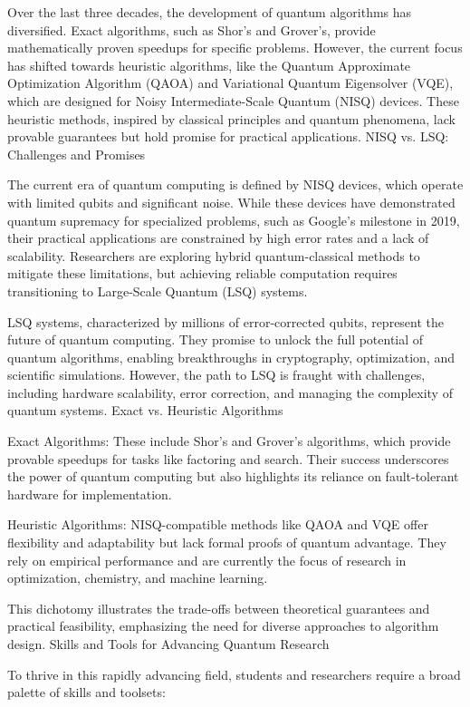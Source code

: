 Over the last three decades, the development of quantum algorithms has diversified. Exact algorithms, such as Shor’s and Grover’s, provide mathematically proven speedups for specific problems. However, the current focus has shifted towards heuristic algorithms, like the Quantum Approximate Optimization Algorithm (QAOA) and Variational Quantum Eigensolver (VQE), which are designed for Noisy Intermediate-Scale Quantum (NISQ) devices. These heuristic methods, inspired by classical principles and quantum phenomena, lack provable guarantees but hold promise for practical applications.
NISQ vs. LSQ: Challenges and Promises

The current era of quantum computing is defined by NISQ devices, which operate with limited qubits and significant noise. While these devices have demonstrated quantum supremacy for specialized problems, such as Google’s milestone in 2019, their practical applications are constrained by high error rates and a lack of scalability. Researchers are exploring hybrid quantum-classical methods to mitigate these limitations, but achieving reliable computation requires transitioning to Large-Scale Quantum (LSQ) systems.

LSQ systems, characterized by millions of error-corrected qubits, represent the future of quantum computing. They promise to unlock the full potential of quantum algorithms, enabling breakthroughs in cryptography, optimization, and scientific simulations. However, the path to LSQ is fraught with challenges, including hardware scalability, error correction, and managing the complexity of quantum systems.
Exact vs. Heuristic Algorithms

    Exact Algorithms: These include Shor’s and Grover’s algorithms, which provide provable speedups for tasks like factoring and search. Their success underscores the power of quantum computing but also highlights its reliance on fault-tolerant hardware for implementation.

    Heuristic Algorithms: NISQ-compatible methods like QAOA and VQE offer flexibility and adaptability but lack formal proofs of quantum advantage. They rely on empirical performance and are currently the focus of research in optimization, chemistry, and machine learning.

This dichotomy illustrates the trade-offs between theoretical guarantees and practical feasibility, emphasizing the need for diverse approaches to algorithm design.
Skills and Tools for Advancing Quantum Research

To thrive in this rapidly advancing field, students and researchers require a broad palette of skills and toolsets:

